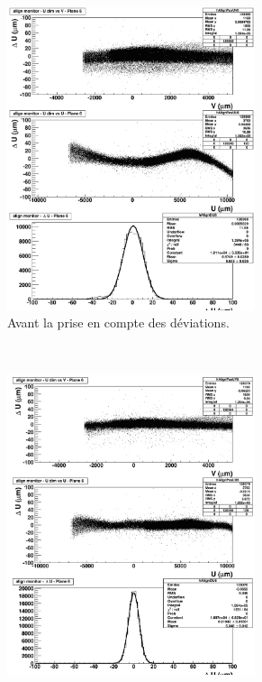 \documentclass[a4papper, 10pt]{article}
\begin{document}
    \begin{figure}  
        \centering
        \begin{subfigure}[t]{0.4\textwidth}
            \includegraphics[width = 0.8\textwidth]{Pictures/RsAlign_226021_pl6_deformed2.png}
            \caption{Avant la prise en compte des déviations. }
            \label{fig:deformation}
        \end{subfigure}
        ~%
        \begin{subfigure}[t]{0.4\textwidth}
            \includegraphics[width = 0.8\textwidth]{Pictures/RsAlign_226021_pl6_corrected2.png}

\end{subfigure}
\end{figure}
\end{document}
